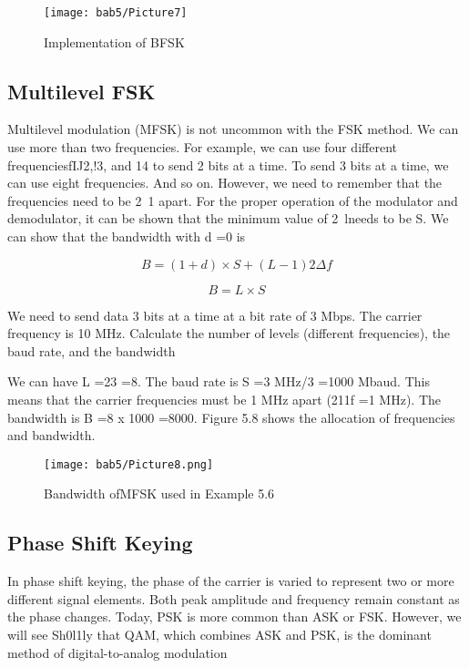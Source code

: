 \begin{figure}[htbp]
  \centering
  \texttt{[image: bab5/Picture7]}
  \caption{Implementation of BFSK}
  \label{fig5:7}
\end{figure}

\subsection*{Multilevel FSK}
Multilevel modulation (MFSK) is not uncommon with the FSK method. We can use more than two frequencies. For example, we can use four different frequenciesfIJ2,!3, and 14 to send 2 bits at a time. To send 3 bits at a time, we can use eight frequencies. And so on. However, we need to remember that the frequencies need to be 2~1 apart. For the proper operation of the modulator and demodulator, it can be shown that the minimum value of 2~lneeds to be S. We can show that the bandwidth with d =0 is

\begin{equation}
  B = (1 + d) \times S + (L - 1)2\Delta f
\end{equation}

\begin{equation}
  B = L \times S
\end{equation}

\begin{example}
  We need to send data 3 bits at a time at a bit rate of 3 Mbps. The carrier frequency is 10 MHz. Calculate the number of levels (different frequencies), the baud rate, and the bandwidth
\end{example}

\begin{solution}
  We can have L =23 =8. The baud rate is S =3 MHz/3 =1000 Mbaud. This means that the carrier frequencies must be 1 MHz apart (211f =1 MHz). The bandwidth is B =8 x 1000 =8000. Figure 5.8 shows the allocation of frequencies and bandwidth.
\end{solution}

\begin{figure}
  \centering
  \texttt{[image: bab5/Picture8.png]}
  \caption{Bandwidth ofMFSK used in Example 5.6}
  \label{fig5:8}
\end{figure}

\subsection{Phase Shift Keying}
In phase shift keying, the phase of the carrier is varied to represent two or more different signal elements. Both peak amplitude and frequency remain constant as the phase changes. Today, PSK is more common than ASK or FSK. However, we will see Sh0l1ly that QAM, which combines ASK and PSK, is the dominant method of digital-to-analog modulation

